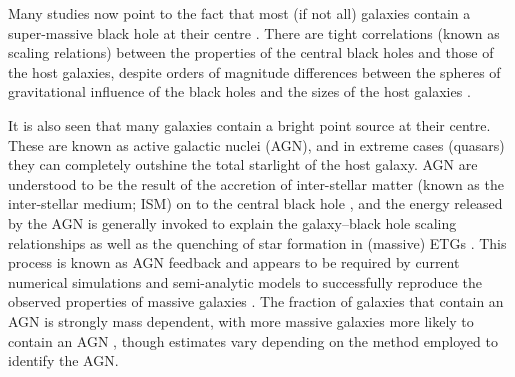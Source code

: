 	Many studies now point to the fact that most (if not all) galaxies contain a super-massive black hole at their centre \citep[e.g.][]{Kormendy2013a}. There are tight correlations (known as scaling relations) between the properties of the central black holes and those of the host galaxies, despite orders of magnitude differences between the spheres of gravitational influence of the black holes and the sizes of the host galaxies \citep[e.g.][]{Gudehus1973, Faber1976, Ferrarese2000, Gebhardt2000}. 

	It is also seen that many galaxies contain a bright point source at their centre. These are known as active galactic nuclei (AGN), and in extreme cases (quasars) they can completely outshine the total starlight of the host galaxy. AGN are understood to be the result of the accretion of  inter-stellar matter (known as the inter-stellar medium; ISM) on to the central black hole \citep[e.g.][]{Lynden-Bell1969}, and the energy released by the AGN is generally invoked to explain the galaxy--black hole scaling relationships \citep[e.g.][]{Raimundo2010} as well as the quenching of star formation in (massive) ETGs \citep[e.g.][]{Croton2006, Somerville2008}. This process is known as AGN feedback and appears to be required by current numerical simulations and semi-analytic models to successfully reproduce the observed properties of massive galaxies \citep[e.g.][]{Kauffmann2000, Granato2004, DiMatteo2005, Springel2005, Bower2006, Croton2006, Hopkins2006, Ciotti2010, Scannapieco2012}. The fraction of galaxies that contain an AGN is strongly mass dependent, with more massive galaxies more likely to contain an AGN \citep[e.g.][]{Kauffmann2003a}, though estimates vary depending on the method employed to identify the AGN.


